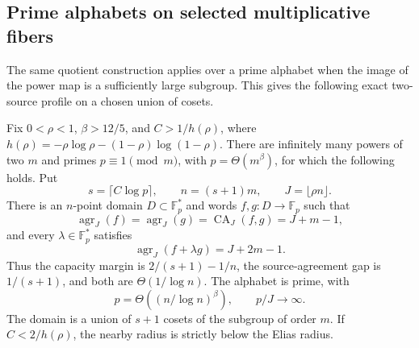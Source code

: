 \subsection{Prime alphabets on selected multiplicative fibers}
\label{subsec:prime-random-fibers}

The same quotient construction applies over a prime alphabet when the
image of the power map is a sufficiently large subgroup.  This gives
the following exact two-source profile on a chosen union of cosets.



\begin{theorem}\label{thm:prime-random-fiber-log-gap}
Fix $0<\rho<1$, $\beta>12/5$, and
$C>1/h(\rho)$, where
$h(\rho)=-\rho\log\rho-(1-\rho)\log(1-\rho)$.
There are infinitely many powers of two $m$ and primes
$p\equiv1\pmod m$, with $p=\Theta(m^\beta)$, for which the following
holds.  Put
\[
 s=\lceil C\log p\rceil,\qquad n=(s+1)m,\qquad
 J=\lfloor\rho n\rfloor.
\]
There is an $n$-point domain $D\subset\mathbb F_p^*$ and words
$f,g:D\to\mathbb F_p$ such that
\[
 \operatorname{agr}_J(f)=\operatorname{agr}_J(g)
 =\operatorname{CA}_J(f,g)=J+m-1,
\]
and every $\lambda\in\mathbb F_p^*$ satisfies
\[
 \operatorname{agr}_J(f+\lambda g)=J+2m-1.
\]
Thus the capacity margin is $2/(s+1)-1/n$, the source-agreement gap
is $1/(s+1)$, and both are $\Theta(1/\log n)$.
The alphabet is prime, with
\[
 p=\Theta\!\left((n/\log n)^\beta\right),\qquad p/J\longrightarrow\infty.
\]
The domain is a union of $s+1$ cosets of the subgroup of order $m$.
If $C<2/h(\rho)$, the nearby radius is strictly below the Elias radius.
\end{theorem}

